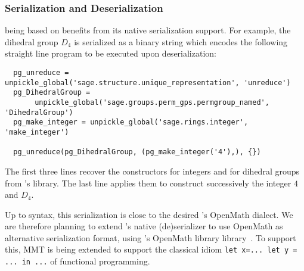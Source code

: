 \subsubsection{Serialization and Deserialization}

\Sage being based on \Python benefits from its native serialization
support. For example, the dihedral group $D_4$ is serialized as a
binary string which encodes the following straight line program to be
executed upon deserialization:
\begin{lstlisting}
  pg_unreduce = unpickle_global('sage.structure.unique_representation', 'unreduce')
  pg_DihedralGroup = 
       unpickle_global('sage.groups.perm_gps.permgroup_named', 'DihedralGroup')
  pg_make_integer = unpickle_global('sage.rings.integer', 'make_integer')

  pg_unreduce(pg_DihedralGroup, (pg_make_integer('4'),), {})
\end{lstlisting}
The first three lines recover the constructors for integers and for
dihedral groups from \Sage's library. The last line applies them to
construct successively the integer $4$ and $D_4$.

Up to syntax, this serialization is close to the desired \Sage's
OpenMath dialect.
We are therefore planning to extend \Python's native (de)serializer to
use OpenMath as alternative serialization format, using \Python's
OpenMath library library~\cite{py-openmath:on}. To support this, MMT
is being extended to support the classical idiom
\lstinline{let x=... let y = ... in ...}
of functional programming.

